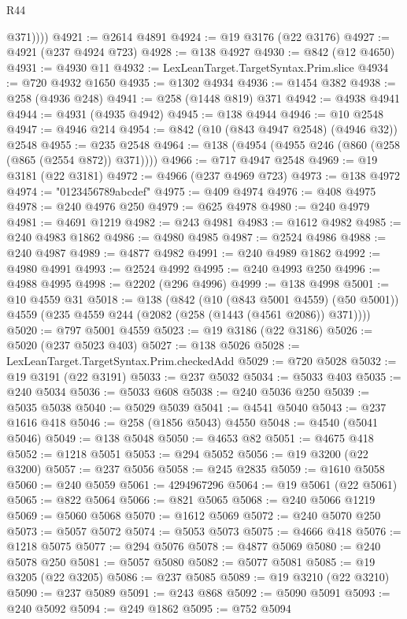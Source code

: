 \begin{lexlean}{R44}
\begin{coremodule}
{            @371))))
@4921 := @2614 @4891
@4924 := @19 @3176 (@22 @3176)
@4927 := @4921 (@237 @4924 @723)
@4928 := @138 @4927
@4930 := @842 (@12 @4650)
@4931 := @4930 @11
@4932 := LexLeanTarget.TargetSyntax.Prim.slice
@4934 := @720 @4932 @1650
@4935 := @1302 @4934
@4936 := @1454 @382
@4938 := @258 (@4936 @248)
@4941 := @258 (@1448 @819) @371
@4942 := @4938 @4941
@4944 := @4931 (@4935 @4942)
@4945 := @138 @4944
@4946 := @10 @2548
@4947 := @4946 @214
@4954 := @842 (@10 (@843 @4947 @2548) (@4946 @32)) @2548
@4955 := @235 @2548
@4964 := @138 (@4954 (@4955 @246 (@860 (@258 (@865 (@2554 @872)) @371))))
@4966 := @717 @4947 @2548
@4969 := @19 @3181 (@22 @3181)
@4972 := @4966 (@237 @4969 @723)
@4973 := @138 @4972
@4974 := "0123456789abcdef"
@4975 := @409 @4974
@4976 := @408 @4975
@4978 := @240 @4976 @250
@4979 := @625 @4978
@4980 := @240 @4979
@4981 := @4691 @1219
@4982 := @243 @4981
@4983 := @1612 @4982
@4985 := @240 @4983 @1862
@4986 := @4980 @4985
@4987 := @2524 @4986
@4988 := @240 @4987
@4989 := @4877 @4982
@4991 := @240 @4989 @1862
@4992 := @4980 @4991
@4993 := @2524 @4992
@4995 := @240 @4993 @250
@4996 := @4988 @4995
@4998 := @2202 (@296 @4996)
@4999 := @138 @4998
@5001 := @10 @4559 @31
@5018 := @138
    (@842
      (@10 (@843 @5001 @4559) (@50 @5001))
      @4559
      (@235 @4559 @244 (@2082 (@258 (@1443 (@4561 @2086)) @371))))
@5020 := @797 @5001 @4559
@5023 := @19 @3186 (@22 @3186)
@5026 := @5020 (@237 @5023 @403)
@5027 := @138 @5026
@5028 := LexLeanTarget.TargetSyntax.Prim.checkedAdd
@5029 := @720 @5028
@5032 := @19 @3191 (@22 @3191)
@5033 := @237 @5032
@5034 := @5033 @403
@5035 := @240 @5034
@5036 := @5033 @608
@5038 := @240 @5036 @250
@5039 := @5035 @5038
@5040 := @5029 @5039
@5041 := @4541 @5040
@5043 := @237 @1616 @418
@5046 := @258 (@1856 @5043) @4550
@5048 := @4540 (@5041 @5046)
@5049 := @138 @5048
@5050 := @4653 @82
@5051 := @4675 @418
@5052 := @1218 @5051
@5053 := @294 @5052
@5056 := @19 @3200 (@22 @3200)
@5057 := @237 @5056
@5058 := @245 @2835
@5059 := @1610 @5058
@5060 := @240 @5059
@5061 := 4294967296
@5064 := @19 @5061 (@22 @5061)
@5065 := @822 @5064
@5066 := @821 @5065
@5068 := @240 @5066 @1219
@5069 := @5060 @5068
@5070 := @1612 @5069
@5072 := @240 @5070 @250
@5073 := @5057 @5072
@5074 := @5053 @5073
@5075 := @4666 @418
@5076 := @1218 @5075
@5077 := @294 @5076
@5078 := @4877 @5069
@5080 := @240 @5078 @250
@5081 := @5057 @5080
@5082 := @5077 @5081
@5085 := @19 @3205 (@22 @3205)
@5086 := @237 @5085
@5089 := @19 @3210 (@22 @3210)
@5090 := @237 @5089
@5091 := @243 @868
@5092 := @5090 @5091
@5093 := @240 @5092
@5094 := @249 @1862
@5095 := @752 @5094
}
\end{coremodule}
\end{lexlean}
